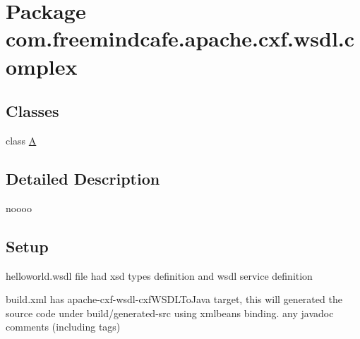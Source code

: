 \hypertarget{namespacecom_1_1freemindcafe_1_1apache_1_1cxf_1_1wsdl_1_1complex}{}\section{Package com.\+freemindcafe.\+apache.\+cxf.\+wsdl.\+complex}
\label{namespacecom_1_1freemindcafe_1_1apache_1_1cxf_1_1wsdl_1_1complex}
\subsection*{Classes}
\begin{DoxyCompactItemize}
\item 
class \hyperlink{classcom_1_1freemindcafe_1_1apache_1_1cxf_1_1wsdl_1_1complex_1_1_a}{A}
\end{DoxyCompactItemize}


\subsection{Detailed Description}
noooo \subsection*{Setup }

helloworld.\+wsdl file had xsd types definition and wsdl service definition

build.\+xml has apache-\/cxf-\/wsdl-\/cxf\+W\+S\+D\+L\+To\+Java target, this will generated the source code under build/generated-\/src using xmlbeans binding. any javadoc comments (including tags) 